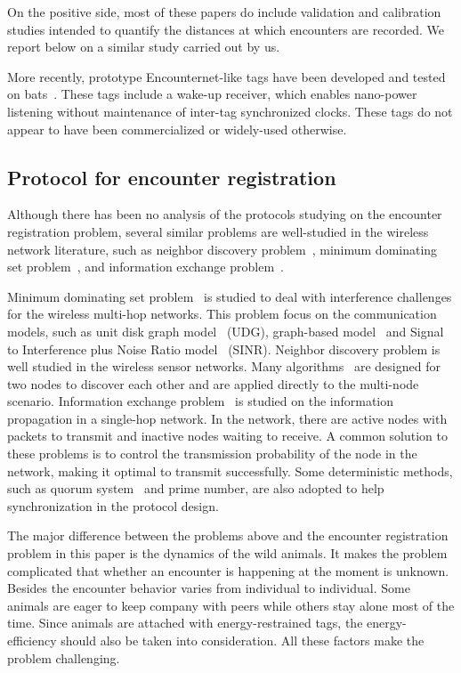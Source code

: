 On the positive side, most of these papers do include validation and calibration studies intended to quantify the distances
at which encounters are recorded. We report below on a similar study carried out by us.

More recently, prototype Encounternet-like tags have been developed and tested on
bats~\cite{Ripperger2016ProximitySensing,dressler2016bats}. These tags include a wake-up receiver, which
enables nano-power listening without maintenance of inter-tag synchronized clocks. These tags  
do not appear to have been commercialized or widely-used otherwise.

\subsection{Protocol for encounter registration}

Although there has been no analysis of the protocols studying on the encounter registration problem,
several similar problems are well-studied in the wireless network literature, 
such as  
neighbor discovery problem~\cite{Bakht2012Searchlight, Sun2014Hello}, 
minimum dominating set problem~\cite{Scheideler2008An},
and information exchange problem~\cite{Capetanakis1979Tree,Yu2017Uniform}.

Minimum dominating set problem~\cite{Scheideler2008An} is studied to 
deal with interference challenges for the wireless multi-hop networks.
This problem focus on the communication models, such as unit disk graph model~\cite{Lebhar2009Unit} (UDG),
graph-based model~\cite{De2007A} and Signal to Interference plus Noise Ratio model~\cite{Lee2007Signal} (SINR).
Neighbor discovery problem is well studied in the wireless sensor 
networks. Many algorithms~\cite{Bakht2012Searchlight, Sun2014Hello} 
are designed for two nodes to discover each other and 
are applied directly to the multi-node scenario.
Information exchange problem~\cite{Capetanakis1979Tree,Yu2017Uniform} is 
studied on the information propagation in a single-hop network. 
In the network, there are active nodes with packets to transmit 
and inactive nodes waiting to receive.
A common solution to these problems is to control the transmission probability of the node in the 
network, making it optimal to transmit successfully.
Some deterministic methods, such as quorum system~\cite{Peleg1995The} and prime number, are also 
adopted to help synchronization in the protocol design.

The major difference between the problems above and the encounter registration problem
in this paper is the dynamics of the wild animals. It makes the problem complicated that whether an encounter is happening at the moment is unknown.
Besides the encounter behavior varies from individual to individual. Some animals are eager to 
keep company with peers while others stay alone most of the time.
Since animals are attached with energy-restrained
tags, the energy-efficiency should also be taken into consideration.
All these factors make the problem challenging.
  

